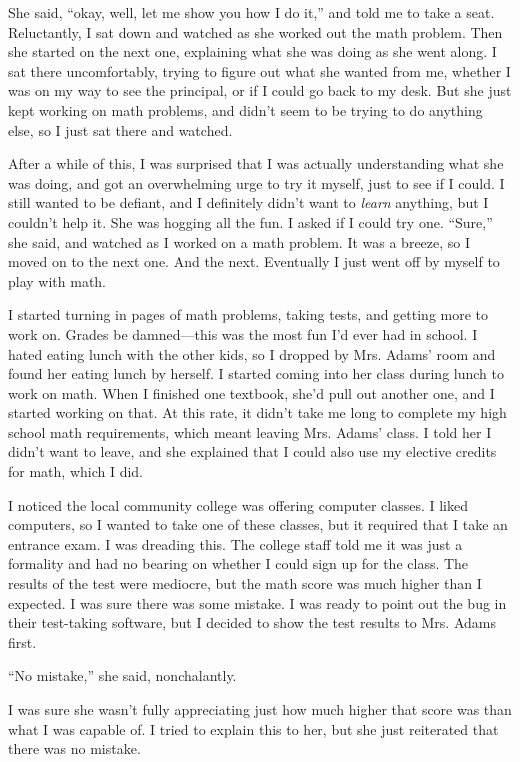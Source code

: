 She said, ``okay, well, let me show you how I do it,'' and told me to take a seat. Reluctantly, I sat down and watched as she worked out the math problem. Then she started on the next one, explaining what she was doing as she went along. I sat there uncomfortably, trying to figure out what she wanted from me, whether I was on my way to see the principal, or if I could go back to my desk. But she just kept working on math problems, and didn't seem to be trying to do anything else, so I just sat there and watched.

After a while of this, I was surprised that I was actually understanding what she was doing, and got an overwhelming urge to try it myself, just to see if I could. I still wanted to be defiant, and I definitely didn't want to \emph{learn} anything, but I couldn't help it. She was hogging all the fun. I asked if I could try one. ``Sure,'' she said, and watched as I worked on a math problem. It was a breeze, so I moved on to the next one. And the next. Eventually I just went off by myself to play with math.

I started turning in pages of math problems, taking tests, and getting more to work on. Grades be damned---this was the most fun I'd ever had in school. I hated eating lunch with the other kids, so I dropped by Mrs. Adams' room and found her eating lunch by herself. I started coming into her class during lunch to work on math. When I finished one textbook, she'd pull out another one, and I started working on that. At this rate, it didn't take me long to complete my high school math requirements, which meant leaving Mrs. Adams' class. I told her I didn't want to leave, and she explained that I could also use my elective credits for math, which I did. 

I noticed the local community college was offering computer classes. I liked computers, so I wanted to take one of these classes, but it required that I take an entrance exam. I was dreading this. The college staff told me it was just a formality and had no bearing on whether I could sign up for the class. The results of the test were mediocre, but the math score was much higher than I expected. I was sure there was some mistake. I was ready to point out the bug in their test-taking software, but I decided to show the test results to Mrs. Adams first.

``No mistake,'' she said, nonchalantly.

I was sure she wasn't fully appreciating just how much higher that score was than what I was capable of. I tried to explain this to her, but she just reiterated that there was no mistake.

